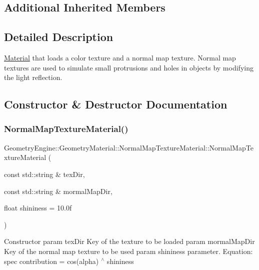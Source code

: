 \subsection*{Additional Inherited Members}


\subsection{Detailed Description}
\mbox{\hyperlink{class_geometry_engine_1_1_geometry_material_1_1_material}{Material}} that loads a color texture and a normal map texture. Normal map textures are used to simulate small protrusions and holes in objects by modifying the light reflection. 

\subsection{Constructor \& Destructor Documentation}
\mbox{\label{class_geometry_engine_1_1_geometry_material_1_1_normal_map_texture_material_a40bc97d75e88354b1bbe58bb5d804a3d}} 
\subsubsection{\texorpdfstring{NormalMapTextureMaterial()}{NormalMapTextureMaterial()}\hspace{0.1cm}{\footnotesize\ttfamily [1/2]}}
{\footnotesize\ttfamily Geometry\+Engine\+::\+Geometry\+Material\+::\+Normal\+Map\+Texture\+Material\+::\+Normal\+Map\+Texture\+Material (\begin{DoxyParamCaption}\item[{const std\+::string \&}]{tex\+Dir,  }\item[{const std\+::string \&}]{mormal\+Map\+Dir,  }\item[{float}]{shininess = {\ttfamily 10.0f} }\end{DoxyParamCaption})}

Constructor param tex\+Dir Key of the texture to be loaded param mormal\+Map\+Dir Key of the normal map texture to be used param shininess parameter. Equation\+: spec contribution = cos(alpha) $^\wedge$ shininess \mbox{\label{class_geometry_engine_1_1_geometry_material_1_1_normal_map_texture_material_ad2ab5dd8a66c2cb63a23f6d8766cab98}} 
